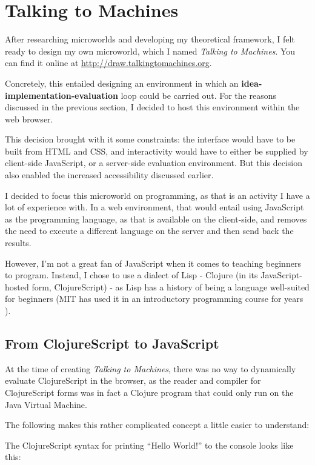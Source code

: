\section{Talking to Machines}

After researching microworlds and developing my theoretical framework, I
felt ready to design my own microworld, which I named \emph{Talking to
Machines}. You can find it online at \url{http://draw.talkingtomachines.org}.

Concretely, this entailed designing an environment in which an
\textbf{idea-implementation-evaluation} loop could be carried out. For the
reasons discussed in the previous section, I decided to host this
environment within the web browser.

This decision brought with it some constraints: the interface would have
to be built from HTML and CSS, and interactivity would have to either be
supplied by client-side JavaScript, or a server-side evaluation
environment. But this decision also enabled the increased accessibility
discussed earlier.

I decided to focus this microworld on programming, as that is an
activity I have a lot of experience with. In a web environment, that
would entail using JavaScript as the programming language, as that is
available on the client-side, and removes the need to execute a
different language on the server and then send back the results.

However, I'm not a great fan of JavaScript when it comes to teaching
beginners to program. Instead, I chose to use
a dialect of Lisp - Clojure (in its JavaScript-hosted form,
ClojureScript) - as Lisp has a history of being a language well-suited
for beginners (MIT has used it in an introductory programming course for years \cite{sicp:course}).

\subsection{From ClojureScript to JavaScript}

At the time of creating \emph{Talking to Machines}, there was no way to
dynamically evaluate ClojureScript in the browser, as the reader and
compiler for ClojureScript forms was in fact a Clojure program that
could only run on the Java Virtual Machine.

The following makes this rather complicated concept a little easier to
understand:

The ClojureScript syntax for printing ``Hello World!'' to the console
looks like this: 

